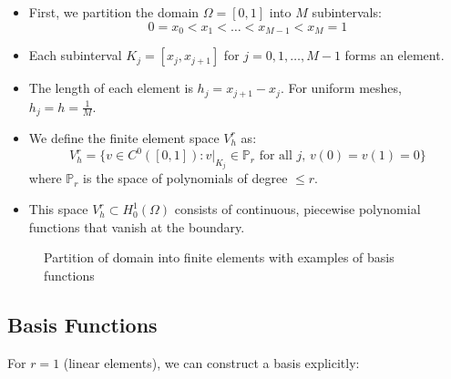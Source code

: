 \begin{itemize}
  \item First, we partition the domain $\Omega = [0,1]$ into $M$ subintervals:
        \[
          0 = x_0 < x_1 < \dots < x_{M-1} < x_M = 1
        \]
  \item Each subinterval $K_j = [x_j, x_{j+1}]$ for $j = 0,1,\dots,M-1$ forms an element.
  \item The length of each element is $h_j = x_{j+1} - x_j$. For uniform meshes, $h_j = h = \frac{1}{M}$.
  \item We define the finite element space $V_h^r$ as:
        \[
          V_h^r = \{v \in C^0([0,1]) : v|_{K_j} \in \mathbb{P}_r \text{ for all } j,\, v(0) = v(1) = 0\}
        \]
        where $\mathbb{P}_r$ is the space of polynomials of degree $\leq r$.
  \item This space $V_h^r \subset H^1_0(\Omega)$ consists of continuous, piecewise polynomial functions that vanish at the boundary.
\end{itemize}

\begin{figure}[H]
  \centering
  \caption{Partition of domain into finite elements with examples of basis functions}
\end{figure}

\subsection{Basis Functions}
For $r=1$ (linear elements), we can construct a basis explicitly:

